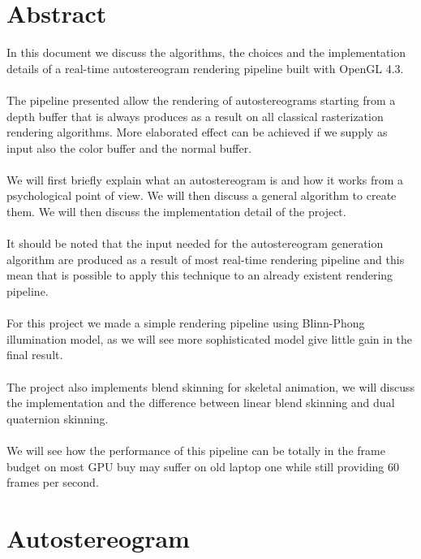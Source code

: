 \documentclass[12pt, a4paper]{article}
\begin{document}
\section{Abstract}
In this document we discuss the algorithms, the choices and the implementation details of a real-time autostereogram rendering pipeline built with OpenGL 4.3.\\\\
The pipeline presented allow the rendering of autostereograms starting from a depth buffer that is always produces
as a result on all classical rasterization rendering algorithms. More elaborated effect can be achieved if we supply as input also the color buffer and 
the normal buffer.\\\\
We will first briefly explain what an autostereogram is and how it works from a psychological point of view. We will then discuss a general algorithm to create them.
We will then discuss the implementation detail of the project.\\\\
It should be noted that the input needed for the autostereogram generation algorithm are produced as a result of most real-time rendering pipeline and this 
mean that is possible to apply this technique to an already existent rendering pipeline.\\\\
For this project we made a simple rendering pipeline using Blinn-Phong illumination model, as we will see more sophisticated model give little gain in 
the final result.\\\\
The project also implements blend skinning for skeletal animation, we will discuss the implementation and the difference between linear blend skinning and
dual quaternion skinning.\\\\
We will see how the performance of this pipeline can be totally in the frame budget on most GPU buy may suffer on old laptop one while still
providing 60 frames per second.

\clearpage
\section{Autostereogram}
\end{document}
